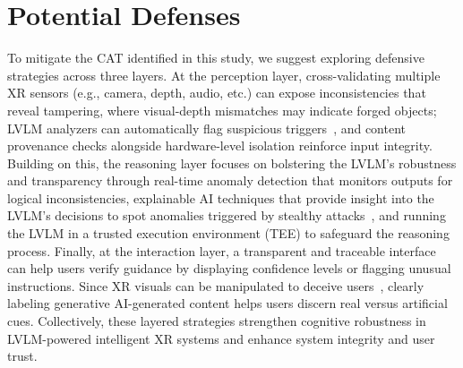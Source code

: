 \documentclass[sigconf,review,anonymous]{acmart}
\begin{document}



\section{Potential Defenses}
\label{sec:defense-strategy}
To mitigate the CAT identified in this study, we suggest exploring defensive strategies across three layers. At the perception layer, cross-validating multiple XR sensors (e.g., camera, depth, audio, etc.) can expose inconsistencies that reveal tampering, where visual-depth mismatches may indicate forged objects; LVLM analyzers can automatically flag suspicious triggers~\cite{xiu2024lobstar}, and content provenance checks alongside hardware-level isolation reinforce input integrity. Building on this, the reasoning layer focuses on bolstering the LVLM's robustness and transparency through real-time anomaly detection that monitors outputs for logical inconsistencies, explainable AI techniques that provide insight into the LVLM's decisions to spot anomalies triggered by stealthy attacks~\cite{kundu2025securing}, and running the LVLM in a trusted execution environment (TEE) to safeguard the reasoning process. Finally, at the interaction layer, a transparent and traceable interface can help users verify guidance by displaying confidence levels or flagging unusual instructions. Since XR visuals can be manipulated to deceive users~\cite{tseng2022dark}, clearly labeling generative AI-generated content helps users discern real versus artificial cues. Collectively, these layered strategies strengthen cognitive robustness in LVLM-powered intelligent XR systems and enhance system integrity and user trust.
\end{document}
